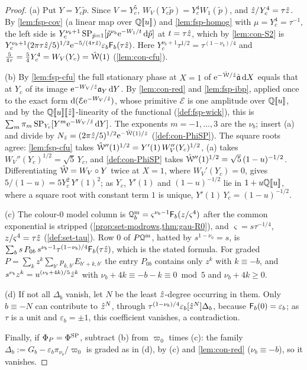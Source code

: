 \begin{proof}
(a) Put $Y=Y_c\tilde p$. Since $V=Y_c^5$, $W_V(Y_c\tilde p)=Y_c^4W_1(\tilde p)$, and $\hat{z}/Y_c^4=\tau\hat{z}$. By \cref{lem:fsp-cov} (a linear map over $\mathbb{Q}[\![ u ]\!]$) and \cref{lem:fsp-homog} with $\mu=Y_c^4=\tau^{-1}$, the left side is $Y_c^{\nu_b+1}\,\mathrm{SP}_{\tilde p=1}[\tilde p^{\nu_b}\mathrm{e}^{-W_1/t}\,\mathrm{d}\tilde p]$ at $t=\tau\hat{z}$, which by \cref{lem:con-S2} is $Y_c^{\nu_b+1}(2\pi\tau\hat{z}/5)^{1/2}\mathrm{e}^{-5/(4\tau\hat{z})}\varepsilon_b\mathsf{F}_b(\tau\hat{z})$. Here $Y_c^{\nu_b+1}\tau^{1/2}=\tau^{(1-\nu_b)/4}$ and $\frac5{4\tau}=\frac54Y_c^4=W_V(Y_c)=\hat{\mathcal{W}}(1)$ (\cref{lem:con-cfu}).

(b) By \cref{lem:fsp-cfu} the full stationary phase at $X=1$ of $\mathrm{e}^{-\hat{\mathcal{W}}/\hat{z}}\hat{\mathfrak{a}}\,\mathrm{d} X$ equals that at $Y_c$ of its image $\mathrm{e}^{-W_V/\hat{z}}\mathfrak{a}_Y\,\mathrm{d} Y$. By \cref{lem:con-red} and \cref{lem:fsp-ibp}, applied once to the exact form $\mathrm{d}(\mathcal E\mathrm{e}^{-W_V/\hat{z}})$, whose primitive $\mathcal E$ is one amplitude over $\mathbb{Q}[\![ u ]\!]$, and by the $\mathbb{Q}[\![ u ]\!][\![ \hat{z} ]\!]$-linearity of the functional (\cref{def:fsp-wick}), this is $\sum_m\pi_m\,\mathrm{SP}_{Y_c}[Y^m\mathrm{e}^{-W_V/\hat{z}}\,\mathrm{d} Y]$. The exponents $m=-1,\dots,3$ are the $\nu_b$; insert (a) and divide by $N_{\hat{z}}=(2\pi\hat{z}/5)^{1/2}\mathrm{e}^{-\hat{\mathcal{W}}(1)/\hat{z}}$ (\cref{def:con-PhiSP}). The square roots agree: \cref{lem:fsp-cfu} takes $\hat{\mathcal{W}}''(1)^{1/2}=Y'(1)\,W_V''(Y_c)^{1/2}$, (a) takes $W_V''(Y_c)^{1/2}=\sqrt5\,Y_c$, and \cref{def:con-PhiSP} takes $\hat{\mathcal{W}}''(1)^{1/2}=\sqrt5\,(1-u)^{-1/2}$. Differentiating $\hat{\mathcal{W}}=W_V\circ Y$ twice at $X=1$, where $W_V'(Y_c)=0$, gives $5/(1-u)=5Y_c^2\,Y'(1)^2$; as $Y_c$, $Y'(1)$ and $(1-u)^{-1/2}$ lie in $1+u\mathbb{Q}[\![ u ]\!]$, where a square root with constant term $1$ is unique, $Y'(1)\,Y_c=(1-u)^{-1/2}$.

(c) The colour-$0$ model column is $\mathcal{Q}^{\mathrm m}_b=\varsigma^{\nu_b-1}\mathsf{F}_b(z/\varsigma^4)$ after the common exponential is stripped (\cref{prop:set-modrows,thm:gau-R0}), and $\varsigma=s\tau^{-1/4}$, $z/\varsigma^4=\tau\hat{z}$ (\cref{def:set-tau}). Row $0$ of $P\mathcal{Q}^{\mathrm m}$, hatted by $s^{1-\nu_0}=s$, is $\sum_bs\,P_{0b}\,s^{\nu_b-1}\tau^{(1-\nu_b)/4}\mathsf{F}_b(\tau\hat{z})$, which is the stated formula. For graded $P=\sum_kz^k\sum_{b'}p_{k,b'}E_{b'+k,b'}$ the entry $P_{0b}$ contains only $z^k$ with $k\equiv-b$, and $s^{\nu_b}z^k=u^{(\nu_b+4k)/5}\hat{z}^k$ with $\nu_b+4k\equiv-b-k\equiv0\bmod5$ and $\nu_b+4k\geq0$.

(d) If not all $\Delta_b$ vanish, let $N$ be the least $\hat{z}$-degree occurring in them. Only $b\equiv-N$ can contribute to $\hat{z}^N$, through $\tau^{(1-\nu_b)/4}\varepsilon_b[\hat{z}^N]\Delta_b$, because $\mathsf{F}_b(0)=\varepsilon_b$; as $\tau$ is a unit and $\varepsilon_b=\pm1$, this coefficient vanishes, a contradiction.

Finally, if $\Phi_P=\Phi^{\mathrm{SP}}$, subtract (b) from $\varpi_0$ times (c): the family $\Delta_b:=G_b-\varepsilon_b\pi_{\nu_b}/\varpi_0$ is graded as in (d), by (c) and \cref{lem:con-red} ($\nu_b\equiv-b$), so it vanishes.
\end{proof}


